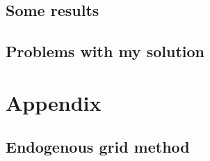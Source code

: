 \documentclass[12pt]{article}
\begin{document}
\subsection{Some results}

\subsection{Problems with my solution}

\newpage

\section{Appendix}
\subsection{Endogenous grid method}
\end{document}
